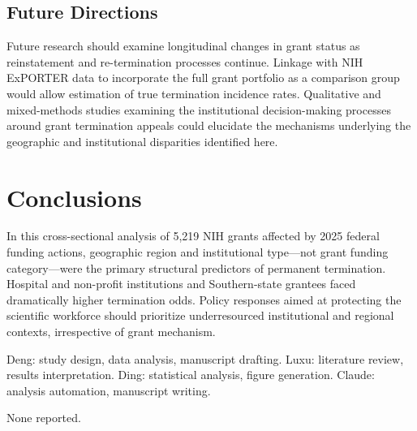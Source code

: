 \documentclass[10pt, letterpaper]{article}
\begin{document}
\subsection*{Future Directions}

Future research should examine longitudinal changes in grant status as reinstatement and re-termination processes continue. Linkage with NIH ExPORTER data to incorporate the full grant portfolio as a comparison group would allow estimation of true termination incidence rates. Qualitative and mixed-methods studies examining the institutional decision-making processes around grant termination appeals could elucidate the mechanisms underlying the geographic and institutional disparities identified here.

\section*{Conclusions}

In this cross-sectional analysis of 5,219 NIH grants affected by 2025 federal funding actions, geographic region and institutional type---not grant funding category---were the primary structural predictors of permanent termination. Hospital and non-profit institutions and Southern-state grantees faced dramatically higher termination odds. Policy responses aimed at protecting the scientific workforce should prioritize underresourced institutional and regional contexts, irrespective of grant mechanism.

\vspace{6pt}
\noindent{\color{jamalightgray}\rule{\textwidth}{0.4pt}}
\vspace{4pt}

 {\fontsize{8.5}{10.5}\selectfont Deng: study design, data analysis, manuscript drafting. Luxu: literature review, results interpretation. Ding: statistical analysis, figure generation. Claude: analysis automation, manuscript writing.}

 {\fontsize{8.5}{10.5}\selectfont None reported.}
\end{document}
